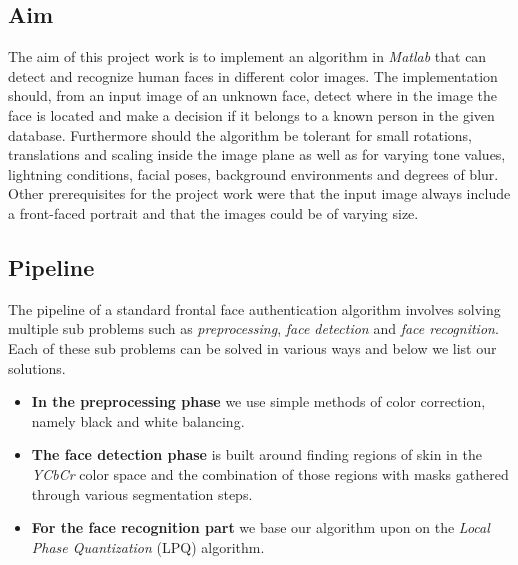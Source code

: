 \subsection{Aim}
The aim of this project work is to implement an algorithm in \textit{Matlab} that can detect and recognize human faces in different color images. The implementation should, from an input image of an unknown face, detect where in the image the face is located and make a decision if it belongs to a known person in the given database. Furthermore should the algorithm be tolerant for small rotations, translations and scaling inside the image plane as well as for varying tone values, lightning conditions, facial poses, background environments and degrees of blur. Other prerequisites for the project work were that the input image always include a front-faced portrait and that the images could be of varying size.


\subsection{Pipeline}
The pipeline of a standard frontal face authentication algorithm involves solving multiple sub problems such as \textit{preprocessing}, \textit{face detection} and \textit{face recognition}. Each of these sub problems can be solved in various ways and below we list our solutions.

\begin{itemize}
  \item \textbf{In the preprocessing phase} we use simple methods of color correction, namely black and white balancing. 
  \item \textbf{The face detection phase} is built around finding regions of skin in the \textit{YCbCr} color space and the combination of those regions with masks gathered through various segmentation steps. 
  \item \textbf{For the face recognition part} we base our algorithm upon on the \textit{Local Phase Quantization} (LPQ) algorithm. 

\end{itemize}
